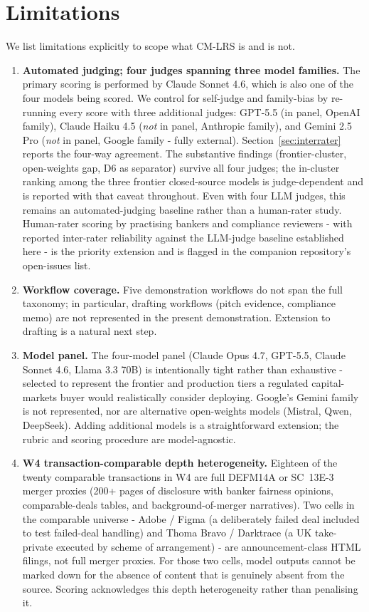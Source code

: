 \documentclass[11pt]{article}
\begin{document}
\section{Limitations}
\label{sec:limitations}

We list limitations explicitly to scope what CM-LRS is and is not.

\begin{enumerate}[leftmargin=*,itemsep=0.2em]
\item \textbf{Automated judging; four judges spanning three model families.} The primary scoring is performed by Claude Sonnet 4.6, which is also one of the four models being scored. We control for self-judge and family-bias by re-running every score with three additional judges: GPT-5.5 (in panel, OpenAI family), Claude Haiku 4.5 (\emph{not} in panel, Anthropic family), and Gemini 2.5 Pro (\emph{not} in panel, Google family - fully external). Section~\ref{sec:interrater} reports the four-way agreement. The substantive findings (frontier-cluster, open-weights gap, D6 as separator) survive all four judges; the in-cluster ranking among the three frontier closed-source models is judge-dependent and is reported with that caveat throughout. Even with four LLM judges, this remains an automated-judging baseline rather than a human-rater study. Human-rater scoring by practising bankers and compliance reviewers - with reported inter-rater reliability against the LLM-judge baseline established here - is the priority extension and is flagged in the companion repository's open-issues list.
\item \textbf{Workflow coverage.} Five demonstration workflows do not span the full taxonomy; in particular, drafting workflows (pitch evidence, compliance memo) are not represented in the present demonstration. Extension to drafting is a natural next step.
\item \textbf{Model panel.} The four-model panel (Claude Opus 4.7, GPT-5.5, Claude Sonnet 4.6, Llama 3.3 70B) is intentionally tight rather than exhaustive - selected to represent the frontier and production tiers a regulated capital-markets buyer would realistically consider deploying. Google's Gemini family is not represented, nor are alternative open-weights models (Mistral, Qwen, DeepSeek). Adding additional models is a straightforward extension; the rubric and scoring procedure are model-agnostic.
\item \textbf{W4 transaction-comparable depth heterogeneity.} Eighteen of the twenty comparable transactions in W4 are full DEFM14A or SC~13E-3 merger proxies (200+ pages of disclosure with banker fairness opinions, comparable-deals tables, and background-of-merger narratives). Two cells in the comparable universe - Adobe / Figma (a deliberately failed deal included to test failed-deal handling) and Thoma Bravo / Darktrace (a UK take-private executed by scheme of arrangement) - are announcement-class HTML filings, not full merger proxies. For those two cells, model outputs cannot be marked down for the absence of content that is genuinely absent from the source. Scoring acknowledges this depth heterogeneity rather than penalising it.

\end{enumerate}
\end{document}
